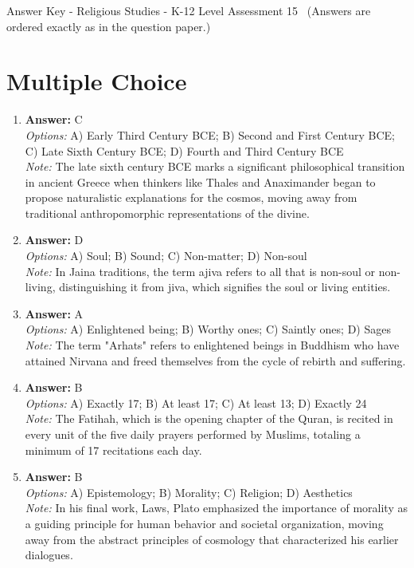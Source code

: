 \documentclass[12pt]{article}
\begin{document}
\begin{center}
Answer Key - Religious Studies - K-12 Level Assessment 15 \
\small (Answers are ordered exactly as in the question paper.)
\end{center}

\section*{Multiple Choice}
\begin{enumerate}[label=\arabic*.]
\item \textbf{Answer:} C
\\ \textit{Options:} A) Early Third Century BCE; B) Second and First Century BCE; C) Late Sixth Century BCE; D) Fourth and Third Century BCE
\\ \textit{Note:} The late sixth century BCE marks a significant philosophical transition in ancient Greece when thinkers like Thales and Anaximander began to propose naturalistic explanations for the cosmos, moving away from traditional anthropomorphic representations of the divine.
\item \textbf{Answer:} D
\\ \textit{Options:} A) Soul; B) Sound; C) Non-matter; D) Non-soul
\\ \textit{Note:} In Jaina traditions, the term ajiva refers to all that is non-soul or non-living, distinguishing it from jiva, which signifies the soul or living entities.
\item \textbf{Answer:} A
\\ \textit{Options:} A) Enlightened being; B) Worthy ones; C) Saintly ones; D) Sages
\\ \textit{Note:} The term "Arhats" refers to enlightened beings in Buddhism who have attained Nirvana and freed themselves from the cycle of rebirth and suffering.
\item \textbf{Answer:} B
\\ \textit{Options:} A) Exactly 17; B) At least 17; C) At least 13; D) Exactly 24
\\ \textit{Note:} The Fatihah, which is the opening chapter of the Quran, is recited in every unit of the five daily prayers performed by Muslims, totaling a minimum of 17 recitations each day.
\item \textbf{Answer:} B
\\ \textit{Options:} A) Epistemology; B) Morality; C) Religion; D) Aesthetics
\\ \textit{Note:} In his final work, Laws, Plato emphasized the importance of morality as a guiding principle for human behavior and societal organization, moving away from the abstract principles of cosmology that characterized his earlier dialogues.
\end{enumerate}
\end{document}

